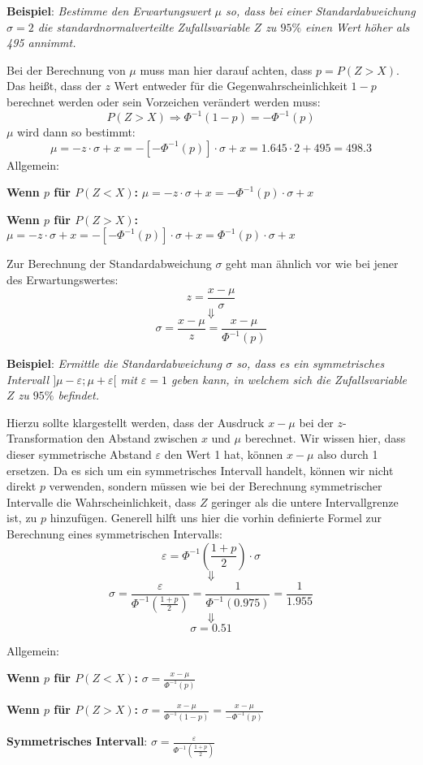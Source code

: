 \textbf{Beispiel}: \emph{Bestimme den Erwartungswert $\mu$ so, dass bei einer Standardabweichung $\sigma = 2$ die standardnormalverteilte Zufallsvariable $Z$ zu $95 \%$ einen Wert h\"{o}her als 495 annimmt.}

Bei der Berechnung von $\mu$ muss man hier darauf achten, dass $p = P(Z > X)$. Das hei\ss{}t, dass der $z$ Wert entweder f\"{u}r die Gegenwahrscheinlichkeit $1 - p$ berechnet werden oder sein Vorzeichen ver\"{a}ndert werden muss: $$P(Z > X) \Rightarrow \Phi^{-1}(1 - p) = -\Phi^{-1}(p)$$ $\mu$ wird dann so bestimmt: $$\mu = -z \cdot \sigma + x = -[-\Phi^{-1}(p)] \cdot \sigma + x = 1.645 \cdot 2 + 495 = 498.3$$ Allgemein:

\textbf{Wenn $p$ f\"{u}r $P(Z < X)$:} $\mu = -z \cdot \sigma + x = -\Phi^{-1}(p) \cdot \sigma + x$

\textbf{Wenn $p$ f\"{u}r $P(Z > X)$:} $\mu = -z \cdot \sigma + x = -[-\Phi^{-1}(p)] \cdot \sigma + x = \Phi^{-1}(p) \cdot \sigma + x$

\pagebreak


Zur Berechnung der Standardabweichung $\sigma$ geht man \"{a}hnlich vor wie bei jener des Erwartungswertes: $$z = \frac{x - \mu}{\sigma}$$ $$\Downarrow$$ $$ \sigma = \frac{x - \mu}{z} = \frac{x - \mu}{\Phi^{-1}(p)}$$

\textbf{Beispiel}: \emph{Ermittle die Standardabweichung $\sigma$ so, dass es ein symmetrisches Intervall $]\mu - \varepsilon ; \mu + \varepsilon[$ mit $\varepsilon = 1$ geben kann, in welchem sich die Zufallsvariable $Z$ zu $95 \%$ befindet.}

Hierzu sollte klargestellt werden, dass der Ausdruck $x - \mu$ bei der $z$-Transformation den Abstand zwischen $x$ und $\mu$ berechnet. Wir wissen hier, dass dieser symmetrische Abstand $\varepsilon$ den Wert 1 hat, k\"{o}nnen $x-\mu$ also durch 1 ersetzen. Da es sich um ein symmetrisches Intervall handelt, k\"{o}nnen wir nicht direkt $p$ verwenden, sondern m\"{u}ssen wie bei der Berechnung symmetrischer Intervalle die Wahrscheinlichkeit, dass $Z$ geringer als die untere Intervallgrenze ist, zu $p$ hinzuf\"{u}gen. Generell hilft uns hier die vorhin definierte Formel zur Berechnung eines symmetrischen Intervalls: $$\varepsilon = \Phi^{-1}\left(\frac{1 + p}{2}\right) \cdot \sigma$$ $$\Downarrow$$ $$\sigma = \frac{\varepsilon}{\Phi^{-1}\left(\frac{1 + p}{2}\right)} = \frac{1}{\Phi^{-1}(0.975)} = \frac{1}{1.955}$$ $$\Downarrow$$ $$\sigma = 0.51$$

Allgemein:

\textbf{Wenn $p$ f\"{u}r $P(Z < X)$:} $\sigma = \frac{x - \mu}{\Phi^{-1}(p)}$

\textbf{Wenn $p$ f\"{u}r $P(Z > X)$:} $\sigma = \frac{x - \mu}{\Phi^{-1}(1 - p)} = \frac{x - \mu}{-\Phi^{-1}(p)}$

\textbf{Symmetrisches Intervall}: $\sigma = \frac{\varepsilon}{\Phi^{-1}\left(\frac{1 + p}{2}\right)}$


